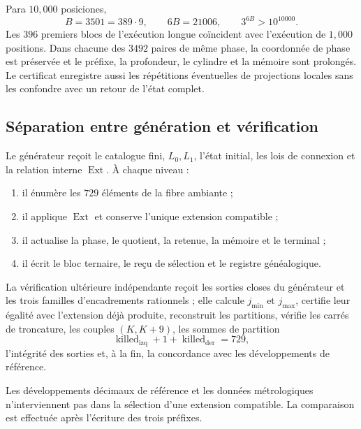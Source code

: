 Para \(10,000\) posiciones,
\[
 B=3501=389\cdot9,
 \qquad
 6B=21006,
 \qquad
 3^{6B}>10^{10000}.
\]
Les \(396\) premiers blocs de l’exécution longue coïncident avec
l’exécution de \(1,000\) positions. Dans chacune des \(3492\) paires de
même phase, la coordonnée de phase est préservée et le préfixe, la
profondeur, le cylindre et la mémoire sont prolongés. Le certificat enregistre aussi les
répétitions éventuelles de projections locales sans les confondre avec un retour
de l’état complet.

\subsection{Séparation entre génération et vérification}

\begin{definition}
Le générateur reçoit le catalogue fini, \(L_0,L_1\), l’état initial, les
lois de connexion et la relation interne \(\operatorname{Ext}\). À chaque niveau :
\begin{enumerate}
 \item il énumère les \(729\) éléments de la fibre ambiante ;
 \item il applique \(\operatorname{Ext}\) et conserve l’unique extension compatible ;
 \item il actualise la phase, le quotient, la retenue, la mémoire et le terminal ;
 \item il écrit le bloc ternaire, le reçu de sélection et le registre généalogique.
\end{enumerate}
\end{definition}

\begin{definition}
La vérification ultérieure indépendante reçoit les sorties closes du
générateur et les trois familles d'encadrements rationnels ; elle calcule
\(j_{\min}\) et \(j_{\max}\), certifie leur égalité avec l'extension déjà
produite, reconstruit les
partitions, vérifie les carrés de troncature, les couples
\((K,K+9)\), les sommes de partition
\[
 \operatorname{killed}_{\mathrm{izq}}+1+\operatorname{killed}_{\mathrm{der}}=729,
\]
l'intégrité des sorties et, à la fin, la concordance avec les développements de référence.
\end{definition}

\begin{theorem}
\label{p12-83-c9-s4:thm:aislamiento-datos-objetivo-precision}
Les développements décimaux de référence et les données métrologiques
n’interviennent pas dans la sélection d’une extension compatible. La comparaison est
effectuée après l’écriture des trois préfixes.
\end{theorem}

